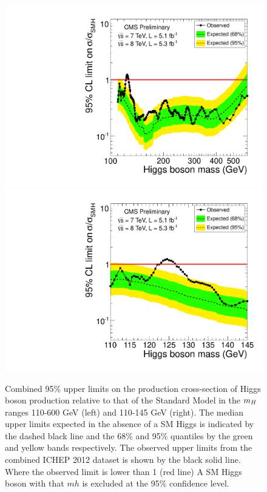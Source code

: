 \begin{figure}[hbt!]
\begin{center}
\includegraphics[width=.49\textwidth]{combinations/ichep2012/Figure_004-a.pdf}
\includegraphics[width=.49\textwidth]{combinations/ichep2012/Figure_004-b.pdf}
\caption{Combined 95\% upper limits on the production cross-section of Higgs boson
production relative to that of the Standard Model in the $m_{H}$ ranges 110-600 GeV (left)
and 110-145 GeV (right). The median upper limits expected in the absence of a SM Higgs
is indicated by the dashed black line and the 68\% and 95\% quantiles by the green and yellow
bands respectively.
The observed upper limits from the combined ICHEP 2012 dataset is shown by the black solid line.
Where the observed limit is lower than 1 (red line) A SM Higgs boson with that $mh$ 
is excluded at the 95\% confidence level.}
\label{fig:combinedexcl}
\end{center}

\end{figure}
